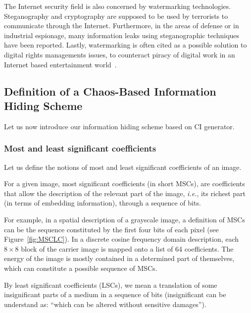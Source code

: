\documentclass[journal]{IEEEtran}
\begin{document}
The Internet security field is also concerned by watermarking technologies. Steganography and cryptography are supposed to be used by terrorists to communicate through the Internet. Furthermore, in the areas of defense or in industrial espionage, many information leaks using steganographic techniques have been reported. Lastly, watermarking is often cited as a possible solution to digital rights managements issues, to counteract piracy of digital work in an Internet based entertainment world~\cite{Nakashima2003}.


\subsection{Definition of a Chaos-Based Information Hiding Scheme}
\label{sec:Algo}

Let us now introduce our information hiding scheme based on CI generator.


\subsubsection{Most and least significant coefficients}

Let us define the notions of most and least significant coefficients of an image.

\begin{Definition}
\label{definitionMSC}
For a given image, most significant coefficients (in short MSCs), are coefficients that allow the description of the relevant part of the image, \emph{i.e.}, its richest part (in terms of embedding information), through a sequence of bits.
\end{Definition}

For example, in a spatial description of a grayscale image, a definition of MSCs can be the sequence constituted by the first four bits of each pixel (see Figure~\ref{fig:MSCLC}). In a discrete cosine frequency domain description, each $8\times 8$ block of the carrier image is mapped onto a list of 64 coefficients. The energy of the image is mostly contained in a determined part of themselves, which can constitute a possible sequence of MSCs.

\begin{Definition}
\label{definitionLSC}
By least significant coefficients (LSCs), we mean a translation of some insignificant parts of a medium in a sequence of bits (insignificant can be understand as: ``which can be altered without sensitive damages'').
\end{Definition}
\end{document}

